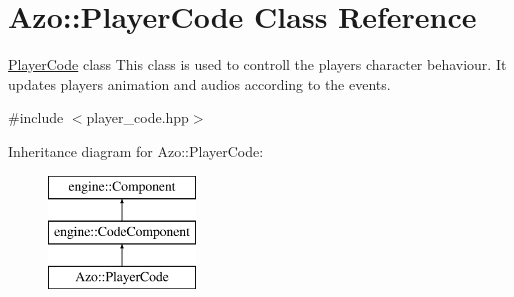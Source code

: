 \hypertarget{class_azo_1_1_player_code}{}\section{Azo\+:\+:Player\+Code Class Reference}
\label{class_azo_1_1_player_code}


\hyperlink{class_azo_1_1_player_code}{Player\+Code} class This class is used to controll the player\textquotesingle{}s character behaviour. It updates player\textquotesingle{}s animation and audios according to the events.  




{\ttfamily \#include $<$player\+\_\+code.\+hpp$>$}

Inheritance diagram for Azo\+:\+:Player\+Code\+:\begin{figure}[H]
\begin{center}
\leavevmode
\includegraphics[height=3.000000cm]{class_azo_1_1_player_code}
\end{center}
\end{figure}
